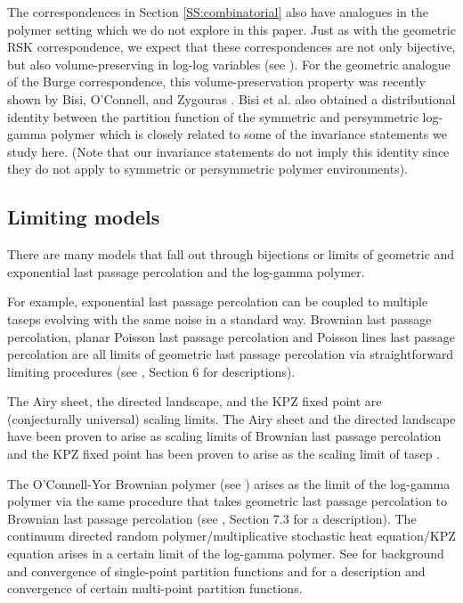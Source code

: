 \documentclass[aop, preprint]{imsart}
\theoremstyle{plain}
\theoremstyle{definition}
\theoremstyle{plain}
\begin{document}
The correspondences in Section \ref{SS:combinatorial} also have analogues in the polymer setting which we do not explore in this paper. Just as with the geometric RSK correspondence, we expect that these correspondences are not only bijective, but also volume-preserving in log-log variables (see \cite{o2014geometric}). For the geometric analogue of the Burge correspondence, this volume-preservation property was recently shown by Bisi, O'Connell, and Zygouras \cite{bisi2020geometric}. Bisi et al. \cite{bisi2020geometric} also obtained a distributional identity between the partition function of the symmetric and persymmetric log-gamma polymer which is closely related to some of the invariance statements we study here. (Note that our invariance statements do not imply this identity since they do not apply to symmetric or persymmetric polymer environments).

\subsection{Limiting models}
\label{SS:limits}

There are many models that fall out through bijections or limits of geometric and exponential last passage percolation and the log-gamma polymer. 

For example, exponential last passage percolation can be coupled to multiple taseps evolving with the same noise in a standard way. Brownian last passage percolation, planar Poisson last passage percolation and Poisson lines last passage percolation are all limits of geometric last passage percolation via straightforward limiting procedures (see \citep{dauvergne2019uniform}, Section 6 for descriptions). 

The Airy sheet, the directed landscape, and the KPZ fixed point are (conjecturally universal) scaling limits. The Airy sheet and the directed landscape have been proven to arise as scaling limits of Brownian last passage percolation  \citep{DOV} and the KPZ fixed point has been proven to arise as the scaling limit of tasep  \citep{matetski2016kpz}. 

The O'Connell-Yor Brownian polymer (see \citep{o2001brownian}) arises as the limit of the log-gamma polymer via the same procedure that takes geometric last passage percolation to Brownian last passage percolation (see \citep{borodin2019shift}, Section 7.3 for a description). The continuum directed random polymer/multiplicative stochastic heat equation/KPZ equation arises in a certain limit of the log-gamma polymer. See \citep{alberts2014intermediate, alberts2014continuum} for background and convergence of single-point partition functions and \citep{o2016multi, corwin2017intermediate} for a description and convergence of certain multi-point partition functions.
\end{document}
